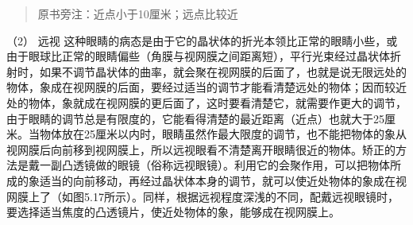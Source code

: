\begin{quote}
原书旁注：近点小于10厘米；远点比较近
\end{quote}

（2） 远视
这种眼睛的病态是由于它的晶状体的折光本领比正常的眼睛小些，或由于眼球比正常的眼睛偏些（角膜与视网膜之间距离短），平行光束经过晶状体折射时，如果不调节晶状体的曲率，就会聚在视网膜的后面了，也就是说无限远处的物体，象成在视网膜的后面，要经过适当的调节才能看清楚远处的物体；因而较近处的物体，象就成在视网膜的更后面了，这时要看清楚它，就需要作更大的调节，由于眼睛的调节总是有限度的，它能看得清楚的最近距离（近点）也就大于25厘米。当物体放在25厘米以内时，眼睛虽然作最大限度的调节，也不能把物体的象从视网膜后向前移到视网膜上，所以远视眼看不清楚离开眼睛很近的物体。矫正的方法是戴一副凸透镜做的眼镜（俗称远视眼镜）。利用它的会聚作用，可以把物体所成的象适当的向前移动，再经过晶状体本身的调节，就可以使近处物体的象成在视网膜上了（如图5.17所示）。同样，根据远视程度深浅的不同，配戴远视眼镜时，要选择适当焦度的凸透镜片，使近处物体的象，能够成在视网膜上。

